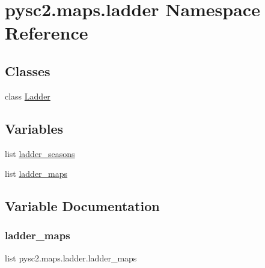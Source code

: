 \hypertarget{namespacepysc2_1_1maps_1_1ladder}{}\section{pysc2.\+maps.\+ladder Namespace Reference}
\label{namespacepysc2_1_1maps_1_1ladder}
\subsection*{Classes}
\begin{DoxyCompactItemize}
\item 
class \mbox{\hyperlink{classpysc2_1_1maps_1_1ladder_1_1_ladder}{Ladder}}
\end{DoxyCompactItemize}
\subsection*{Variables}
\begin{DoxyCompactItemize}
\item 
list \mbox{\hyperlink{namespacepysc2_1_1maps_1_1ladder_a44ba49ec554cb34eb14d42605de8bb79}{ladder\+\_\+seasons}}
\item 
list \mbox{\hyperlink{namespacepysc2_1_1maps_1_1ladder_aba8a0a9a1b536f46c248bce91928cbcc}{ladder\+\_\+maps}}
\end{DoxyCompactItemize}


\subsection{Variable Documentation}
\mbox{\label{namespacepysc2_1_1maps_1_1ladder_aba8a0a9a1b536f46c248bce91928cbcc}} 
\subsubsection{\texorpdfstring{ladder\+\_\+maps}{ladder\_maps}}
{\footnotesize\ttfamily list pysc2.\+maps.\+ladder.\+ladder\+\_\+maps}

